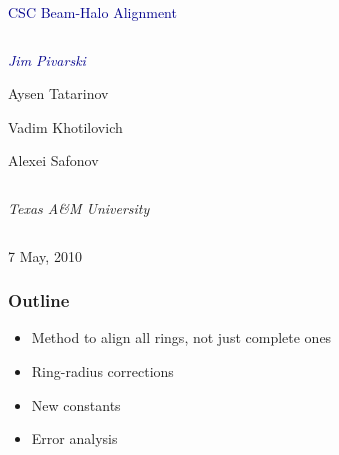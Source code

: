 \documentclass[compress]{beamer}
\begin{document}
\begin{frame}
\vfill
\begin{center}
\textcolor{darkblue}{\Large CSC Beam-Halo Alignment}

\vfill
\begin{columns}
\begin{center}
\large
\textcolor{darkblue}{\it Jim Pivarski}

Aysen Tatarinov

Vadim Khotilovich

Alexei Safonov
\end{center}
\end{columns}

\begin{columns}
\begin{center}
\scriptsize
{\it Texas A\&M University}
\end{center}
\end{columns}

\vfill
 7 May, 2010

\end{center}
\end{frame}


\small

\begin{frame}
\frametitle{Outline}
\begin{itemize}\setlength{\itemsep}{0.5 cm}
\item Method to align all rings, not just complete ones

\item Ring-radius corrections

\item New constants

\item Error analysis
\end{itemize}
\end{frame}
\end{document}
